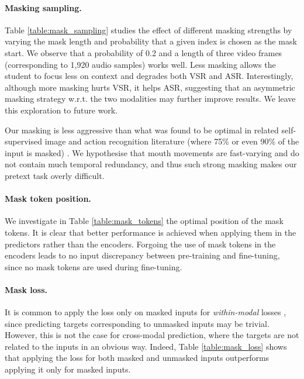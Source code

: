 \documentclass{article} \usepackage{iclr2023_conference,times}
\begin{document}
\paragraph{Masking sampling.} Table \ref{table:mask_sampling} studies the effect of different masking strengths by varying the mask length and probability that a given index is chosen as the mask start. We observe that a probability of 0.2 and a length of three video frames (corresponding to 1,920 audio samples) works well. Less masking allows the student to focus less on context and degrades both VSR and ASR. Interestingly, although more masking hurts VSR, it helps ASR, suggesting that an asymmetric masking strategy w.r.t. the two modalities may further improve results. We leave this exploration to future work.

Our masking is less aggressive than what was found to be optimal in related self-supervised image and action recognition literature (where 75\% or even 90\% of the input is masked) \citep{he2021masked, tong2022videomae}. We hypothesise that mouth movements are fast-varying and do not contain much temporal redundancy, and thus such strong masking makes our pretext task overly difficult.

\paragraph{Mask token position.} We investigate in Table \ref{table:mask_tokens} the optimal position of the mask tokens. It is clear that better performance is achieved when applying them in the predictors rather than the encoders. Forgoing the use of mask tokens in the encoders leads to no input discrepancy between pre-training and fine-tuning, since no mask tokens are used during fine-tuning. 

\paragraph{Mask loss.} It is common to apply the loss only on masked inputs for \textit{within-modal} losses \citep{hsu2021hubert, he2021masked}, since predicting targets corresponding to unmasked inputs may be trivial. However, this is not the case for cross-modal prediction, where the targets are not related to the inputs in an obvious way. Indeed, Table \ref{table:mask_loss} shows that applying the loss for both masked and unmasked inputs outperforms applying it only for masked inputs.
\end{document}
